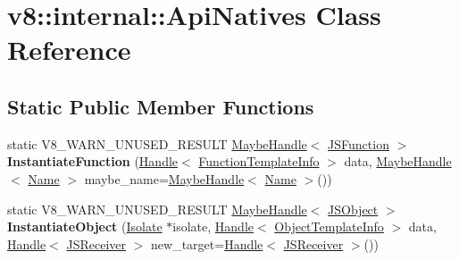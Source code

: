 \hypertarget{classv8_1_1internal_1_1ApiNatives}{}\section{v8\+:\+:internal\+:\+:Api\+Natives Class Reference}
\label{classv8_1_1internal_1_1ApiNatives}
\subsection*{Static Public Member Functions}
\begin{DoxyCompactItemize}
\item 
\mbox{\label{classv8_1_1internal_1_1ApiNatives_ae308122811addb9431d6d7801427f528}} 
static V8\+\_\+\+W\+A\+R\+N\+\_\+\+U\+N\+U\+S\+E\+D\+\_\+\+R\+E\+S\+U\+LT \mbox{\hyperlink{classv8_1_1internal_1_1MaybeHandle}{Maybe\+Handle}}$<$ \mbox{\hyperlink{classv8_1_1internal_1_1JSFunction}{J\+S\+Function}} $>$ {\bfseries Instantiate\+Function} (\mbox{\hyperlink{classv8_1_1internal_1_1Handle}{Handle}}$<$ \mbox{\hyperlink{classv8_1_1internal_1_1FunctionTemplateInfo}{Function\+Template\+Info}} $>$ data, \mbox{\hyperlink{classv8_1_1internal_1_1MaybeHandle}{Maybe\+Handle}}$<$ \mbox{\hyperlink{classv8_1_1internal_1_1Name}{Name}} $>$ maybe\+\_\+name=\mbox{\hyperlink{classv8_1_1internal_1_1MaybeHandle}{Maybe\+Handle}}$<$ \mbox{\hyperlink{classv8_1_1internal_1_1Name}{Name}} $>$())
\item 
\mbox{\label{classv8_1_1internal_1_1ApiNatives_a30519b52bb2d007bc9653989b7764b3c}} 
static V8\+\_\+\+W\+A\+R\+N\+\_\+\+U\+N\+U\+S\+E\+D\+\_\+\+R\+E\+S\+U\+LT \mbox{\hyperlink{classv8_1_1internal_1_1MaybeHandle}{Maybe\+Handle}}$<$ \mbox{\hyperlink{classv8_1_1internal_1_1JSObject}{J\+S\+Object}} $>$ {\bfseries Instantiate\+Object} (\mbox{\hyperlink{classv8_1_1internal_1_1Isolate}{Isolate}} $\ast$isolate, \mbox{\hyperlink{classv8_1_1internal_1_1Handle}{Handle}}$<$ \mbox{\hyperlink{classv8_1_1internal_1_1ObjectTemplateInfo}{Object\+Template\+Info}} $>$ data, \mbox{\hyperlink{classv8_1_1internal_1_1Handle}{Handle}}$<$ \mbox{\hyperlink{classv8_1_1internal_1_1JSReceiver}{J\+S\+Receiver}} $>$ new\+\_\+target=\mbox{\hyperlink{classv8_1_1internal_1_1Handle}{Handle}}$<$ \mbox{\hyperlink{classv8_1_1internal_1_1JSReceiver}{J\+S\+Receiver}} $>$())
\item 
\mbox{\label{classv8_1_1internal_1_1ApiNatives_aef7124e0d28a1bb03847d4253e3abab1}} 

\end{DoxyCompactItemize}

